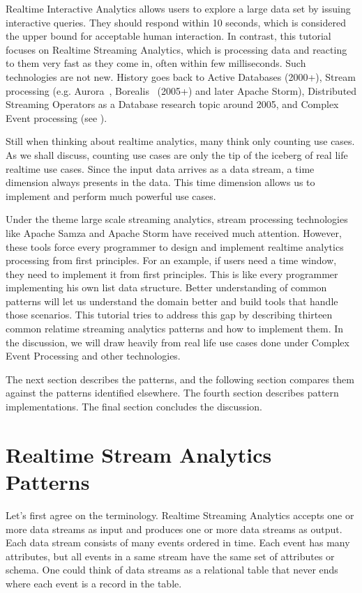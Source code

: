 \documentclass{sig-alternate}
\begin{document}
Realtime Interactive Analytics allows users to explore a large data set by issuing interactive queries. They should respond within 10 seconds, which is considered the upper bound for acceptable human interaction. In contrast, this tutorial focuses on Realtime Streaming Analytics, which is processing data and reacting to them very fast as they come in, often within few milliseconds. Such technologies are not new. History goes back to Active Databases (2000+), Stream processing (e.g. Aurora~\cite{abadi_aurora:_2003}, Borealis~\cite{abadi_design_2005} (2005+) and later Apache Storm), Distributed Streaming Operators as a Database research topic around 2005, and Complex Event processing (see \cite{marketSurvey}).

Still when thinking about realtime analytics, many think only counting use cases. As we shall discuss, counting use cases are only the tip of the iceberg of real life realtime use cases. Since the input data arrives as a data stream, a time dimension always presents in the data. This time dimension allows us to implement and perform much powerful use cases.  

Under the theme large scale streaming analytics, stream processing technologies like Apache Samza and Apache Storm have received much attention. However, these tools force every programmer to design and implement realtime analytics processing from first principles. For an example, if users need a time window, they need to implement it from first principles.  This is like every programmer implementing his own list data structure. Better understanding of common patterns will let us understand the domain better and build tools that handle those scenarios. This tutorial tries to address this gap by describing thirteen common relatime streaming analytics patterns and how to implement them. In the discussion, we will draw heavily from real life use cases done under Complex Event Processing and other technologies. 

The next section describes the patterns, and the following  section compares them against the patterns identified elsewhere. The fourth section describes pattern implementations. The final section concludes the discussion. 

\section{Realtime Stream Analytics Patterns}
 
Let's first agree on the terminology. Realtime Streaming Analytics accepts one or more data streams as input and produces one or more data streams as output. Each data stream consists of many events ordered in time. Each event has many attributes, but all events in a same stream have the same set of attributes or schema. One could think of data streams as a relational table that never ends where each event is a record in the table. 
\end{document}

